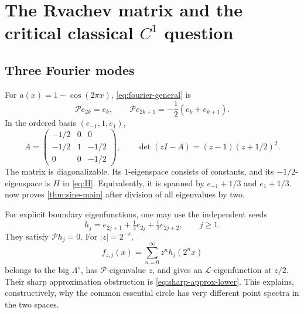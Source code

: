 \documentclass[11pt,a4paper]{article}
\numberwithin{equation}{section}
\theoremstyle{definition}
\theoremstyle{remark}
\newcommand{\Pp}{\mathcal P}
\newcommand{\Ll}{\mathcal L}
\begin{document}
\section{The Rvachev matrix and the critical classical \texorpdfstring{$C^1$}{C1} question}
\label{sec:sine-details}

\subsection{Three Fourier modes}
For $a(x)=1-\cos(2\pi x)$, \eqref{eq:fourier-general} is
\begin{equation}
 \Pp e_{2k}=e_k,\qquad
 \Pp e_{2k+1}=-\frac12(e_k+e_{k+1}).
 \label{eq:sine-fourier}
\end{equation}
In the ordered basis $(e_{-1},1,e_1)$,
\begin{equation}
 A=\begin{pmatrix}
 -1/2&0&0\\
 -1/2&1&-1/2\\
 0&0&-1/2
 \end{pmatrix},\qquad
 \det(zI-A)=(z-1)(z+1/2)^2.
 \label{eq:sine-matrix}
\end{equation}
The matrix is diagonalizable. Its $1$-eigenspace consists of constants,
and its $-1/2$-eigenspace is $H$ in \eqref{eq:H}. Equivalently, it is
spanned by $e_{-1}+1/3$ and $e_1+1/3$.
 now proves \cref{thm:sine-main} after
division of all eigenvalues by two.

For explicit boundary eigenfunctions, one may use the independent seeds
\begin{equation}
 h_j=e_{2j+1}+\tfrac12e_{2j}+\tfrac12e_{2j+2},\qquad j\ge1.
 \label{eq:sine-defects}
\end{equation}
They satisfy $\Pp h_j=0$. For $|z|=2^{-s}$,
\begin{equation}
 f_{z,j}(x)=\sum_{n=0}^\infty z^n h_j(2^n x)
 \label{eq:sine-eigenfunctions}
\end{equation}
belongs to the big $\Lambda^s$, has $\Pp$-eigenvalue $z$, and gives
an $\Ll$-eigenfunction at $z/2$. Their sharp approximation obstruction
is \eqref{eq:sharp-approx-lower}. This explains, constructively, why
the common essential circle has very different point spectra in the
two spaces.
\end{document}
